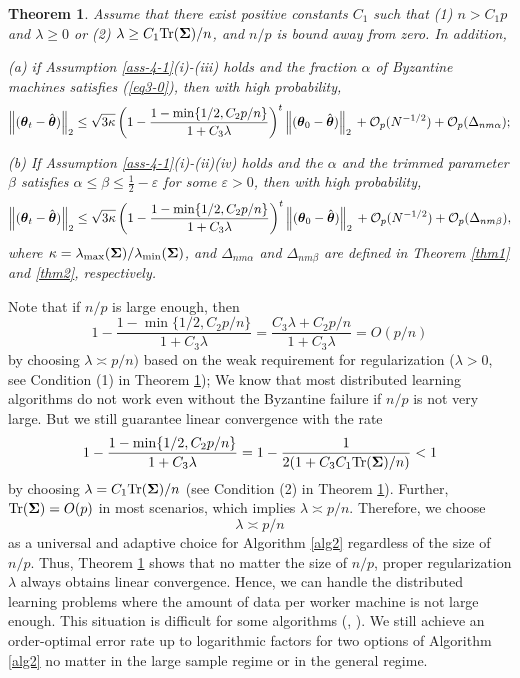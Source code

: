 \documentclass[12pt,a4paper]{article}%
\newtheorem{thm}{Theorem}[section]
\newcommand \vc[1]{{\mbox{\boldmath${#1}$}}}
\newcommand \vtheta{\vc \theta}
\numberwithin{equation}{section}
\newcommand{\sbr}[1]{\left(#1\right)}        %
\begin{document}
\begin{thm}\label{thm8}
Assume that there exist positive constants $C_1$ such that (1) $n>C_1p$ and $\lambda\geq0$ or (2) $\lambda\geq C_1\mathrm{Tr}(\vc\Sigma)/n$, and $n/p$ is bound away from zero. In addition,

(a) if Assumption \ref{ass-4-1}(i)-(iii) holds and the fraction $\alpha$ of Byzantine machines satisfies (\ref{eq3-0}), then with high probability,
$$
\left\|(\vtheta_{t}-\hat{\vtheta})\right\|_2\leq\sqrt{3\kappa}\sbr{1-\frac{1-\min\{1/2,C_2p/n\}}{1+C_3\lambda}}^t\left\|(\vtheta_0-\hat{\vtheta})\right\|_2\nonumber\\
+\mathcal{O}_p(N^{-1/2})+\mathcal{O}_p(\Delta_{nm\alpha});
$$

(b) If Assumption \ref{ass-4-1}(i)-(ii)(iv) holds and the $\alpha$ and the trimmed parameter $\beta$ satisfies $\alpha\leq \beta\leq \frac{1}{2}-\varepsilon$ for some $\varepsilon>0$, then with high probability,
$$
\left\|(\vtheta_{t}-\hat{\vtheta})\right\|_2\leq\sqrt{3\kappa}\sbr{1-\frac{1-\min\{1/2,C_2p/n\}}{1+C_3\lambda}}^t\left\|(\vtheta_0-\hat{\vtheta})\right\|_2\nonumber\\
+\mathcal{O}_p(N^{-1/2})+\mathcal{O}_p(\Delta_{nm\beta}),
$$
where $\kappa=\lambda_{\max}(\vc\Sigma)/\lambda_{\min}(\vc\Sigma)$, and $\Delta_{nm\alpha}$ and $\Delta_{nm\beta}$ are defined in Theorem \ref{thm1} and \ref{thm2}, respectively.
\end{thm}

Note that if $n/p$ is large enough, then
$$1-\frac{1-\min\{1/2,C_2p/n\}}{1+C_3\lambda}=\frac{C_3\lambda+C_2p/n}{1+C_3\lambda}=O(p/n)$$
by choosing $\lambda\asymp p/n)$ based on the weak requirement for regularization ($\lambda>0$, see Condition (1) in Theorem \ref{thm8}); We know that most distributed learning algorithms do not work even without the Byzantine failure if $n/p$ is not very large. But we still guarantee linear convergence with the rate
$$1-\frac{1-\min\{1/2,C_2p/n\}}{1+C_3\lambda}=1-\frac{1}{2(1+C_3C_1\mathrm{Tr}(\vc\Sigma)/n)}<1$$
by choosing $\lambda=C_1\mathrm{Tr}(\vc\Sigma)/n$ (see Condition (2) in Theorem \ref{thm8}). Further, $\mathrm{Tr}(\vc\Sigma)=O(p)$ in most scenarios, which implies $\lambda\asymp p/n$. Therefore, we choose
$$\lambda\asymp p/n$$
as a universal and adaptive choice for Algorithm \ref{alg2} regardless of the size of $n/p$. Thus, Theorem \ref{thm8} shows that no matter the size of $n/p$, proper regularization $\lambda$ always obtains linear convergence. Hence, we can handle the distributed learning problems where the amount of data per worker machine is not large enough. This situation is difficult for some algorithms (\cite{ZhangDuchiW2013}, \cite{JordanLeeYang2019}). We still achieve an order-optimal error rate up to logarithmic factors for two options of Algorithm \ref{alg2} no matter in the large sample regime or in the general regime.
\end{document}
